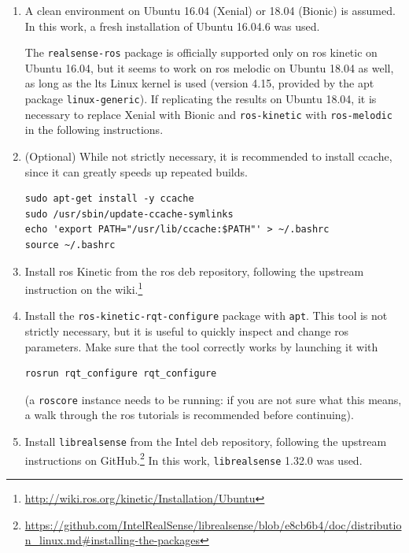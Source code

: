 \documentclass[11pt, letterpaper, twoside]{article}
\begin{document}
\begin{enumerate}

    \item A clean environment on Ubuntu 16.04 (Xenial) or 18.04 (Bionic) is
        assumed. In this work, a fresh installation of Ubuntu 16.04.6 was used.

        The \texttt{realsense-ros} package is officially supported only on
        \gls{ros} kinetic on Ubuntu 16.04, but it seems to work on \gls{ros}
        melodic on Ubuntu 18.04 as well, as long as the \gls{lts} Linux kernel
        is used (version 4.15, provided by the apt package
        \texttt{linux-generic}). If replicating the results on Ubuntu 18.04, it
        is necessary to replace Xenial with Bionic and \texttt{ros-kinetic}
        with \texttt{ros-melodic} in the following instructions.

    \item (Optional) While not strictly necessary, it is recommended to install
        ccache, since it can greatly speeds up repeated builds.
\begin{verbatim}
sudo apt-get install -y ccache
sudo /usr/sbin/update-ccache-symlinks
echo 'export PATH="/usr/lib/ccache:$PATH"' > ~/.bashrc
source ~/.bashrc
\end{verbatim}

    \item Install \gls{ros} Kinetic from the \gls{ros} deb repository,
        following the upstream instruction on the
        wiki.\footnote{\url{http://wiki.ros.org/kinetic/Installation/Ubuntu}}

    \item Install the \texttt{ros-kinetic-rqt-configure} package with
        \texttt{apt}. This tool is not strictly necessary, but it is useful to
        quickly inspect and change \gls{ros} parameters. Make sure that the
        tool correctly works by launching it with
\begin{verbatim}
rosrun rqt_configure rqt_configure
\end{verbatim}
        (a \texttt{roscore} instance needs to be running: if you are not sure
        what this means, a walk through the \gls{ros} tutorials is recommended
        before continuing).

    \item Install \texttt{librealsense} from the Intel deb repository,
        following the upstream instructions on
        GitHub.\footnote{\url{https://github.com/IntelRealSense/librealsense/blob/e8cb6b4/doc/distribution_linux.md\#installing-the-packages}}
        In this work, \texttt{librealsense} 1.32.0 was used.


\end{enumerate}
\end{document}
